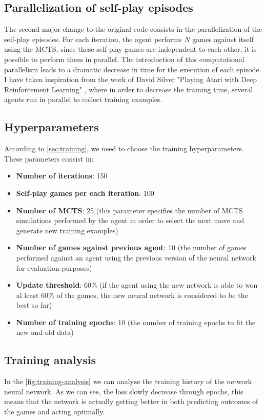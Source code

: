 \documentclass{article}
\begin{document}
\subsection{Parallelization of self-play episodes}
The second major change to the original code consists in the parallelization of the self-play episodes. For each iteration, the agent performs $N$ games against itself using the MCTS, since these self-play games are independent to each-other, it is possible to perform them in parallel. The introduction of this computational parallelism leads to a dramatic decrease in time for the execution of each episode. I have taken inspiration from the work of David Silver "Playing Atari with Deep Reinforcement Learning" \cite{mnih2013atari}, where in order to decrease the training time, several agents run in parallel to collect training examples.

\subsection{Hyperparameters}
According to \autoref{sec:training}, we need to choose the training hyperparameters. These parameters consist in:
\begin{itemize}
	\item \textbf{Number of iterations}: 150
	\item \textbf{Self-play games per each iteration}: 100
	\item \textbf{Number of MCTS}: 25 (this parameter specifies the number of MCTS simulations performed by the agent in order to select the next move and generate new training examples)
	\item \textbf{Number of games against previous agent}: 10 (the number of games performed against an agent using the previous version of the neural network for evaluation purposes)
	\item \textbf{Update threshold}: 60\%
	(if the agent using the new network is able to won al least 60\% of the games, the new neural network is considered to be the best so far)
	\item \textbf{Number of training epochs}: 10 (the number of training epochs to fit the new and old data)
\end{itemize}


\subsection{Training analysis}

In the \autoref{fig:training-analysis} we can analyze the training history of the network neural network. As we can see, the loss slowly decrease through epochs, this means that the network is actually getting better in both predicting outcomes of the games and acting optimally.
\end{document}
